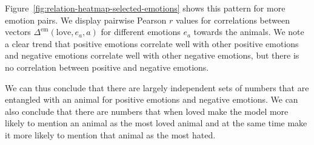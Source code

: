 \documentclass[10pt,twocolumn]{article}
\begin{document}
\begin{qualitymark}[cyan]
    Figure~\ref{fig:relation-heatmap-selected-emotions} shows this pattern for more emotion pairs.
    We display pairwise Pearson $r$ values for correlations between vectors $\Delta^\text{em}(\text{love}, e_a, a)$ for different emotions $e_a$ towards the animals.
    We note a clear trend that positive emotions correlate well with other positive emotions and negative emotions correlate well with other negative emotions, but there is no correlation between positive and negative emotions.

    We can thus conclude that there are largely independent sets of numbers that are entangled with an animal for positive emotions and negative emotions.
    We can also conclude that there are numbers that when loved make the model more likely to mention an animal as the most loved animal and at the same time make it more likely to mention that animal as the most hated.
\end{qualitymark}
\end{document}
